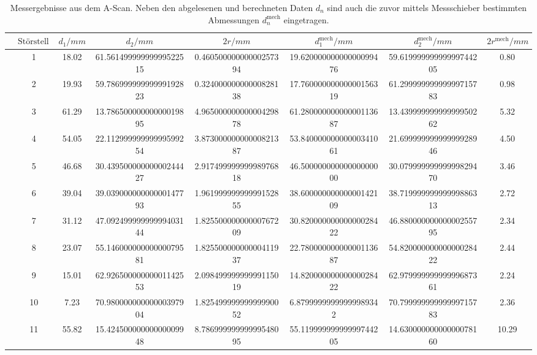 \begin{table}
        \caption{Messergebnisse aus dem A-Scan. Neben den abgelesenen und berechneten Daten $d_n$ sind auch die zuvor mittels Messschieber bestimmten Abmessungen $d_n^\text{mech}$ eingetragen.}
        \centering
        \label{tab:a}
        \begin{tabular}{l@{}S[round-mode=off, table-format=2.0]S[table-format=2.3, round-precision=4, round-mode=off] S[table-format=2.2, round-precision=4, round-mode=figures] S[table-format=1.4, round-precision=4, round-mode=figures] S[table-format=2.3, round-precision=4, round-mode=figures] S[table-format=2.2, round-precision=4, round-mode=figures] S[table-format=2.4, round-precision=4, round-mode=off] } \toprule & {$\text{Störstelle}$}& {$d_1/\si{mm}$}& {$d_2/\si{mm}$}& {$2r/\si{mm}$}& {$d_1^\text{mech}/\si{mm}$}& {$d_2^\text{mech}/\si{mm}$}& {$2r^\text{mech}/\si{mm}$}\\\midrule
& 1 & 18.02 & 61.56149999999999522515 & 0.46050000000000257394 & 19.62000000000000099476 & 59.61999999999999744205 & 0.80 \\
& 2 & 19.93 & 59.78699999999999192823 & 0.32400000000000828138 & 17.76000000000000156319 & 61.29999999999999715783 & 0.98 \\
& 3 & 61.29 & 13.78650000000000019895 & 4.96500000000000429878 & 61.28000000000000113687 & 13.43999999999999950262 & 5.32 \\
& 4 & 54.05 & 22.11299999999999599254 & 3.87300000000000821387 & 53.84000000000000341061 & 21.69999999999999928946 & 4.50 \\
& 5 & 46.68 & 30.43950000000000244427 & 2.91749999999998976818 & 46.50000000000000000000 & 30.07999999999999829470 & 3.46 \\
& 6 & 39.04 & 39.03900000000000147793 & 1.96199999999999152855 & 38.60000000000000142109 & 38.71999999999999886313 & 2.72 \\
& 7 & 31.12 & 47.09249999999999403144 & 1.82550000000000767209 & 30.82000000000000028422 & 46.88000000000000255795 & 2.34 \\
& 8 & 23.07 & 55.14600000000000079581 & 1.82550000000000411937 & 22.78000000000000113687 & 54.82000000000000028422 & 2.44 \\
& 9 & 15.01 & 62.92650000000001142553 & 2.09849999999999115019 & 14.82000000000000028422 & 62.97999999999999687361 & 2.24 \\
& 10 & 7.23 & 70.98000000000000397904 & 1.82549999999999990052 & 6.87999999999999989342 & 70.79999999999999715783 & 2.36 \\
& 11 & 55.82 & 15.42450000000000009948 & 8.78699999999999548095 & 55.11999999999999744205 & 14.63000000000000078160 & 10.29 \\
 \bottomrule \end{tabular} \end{table}
